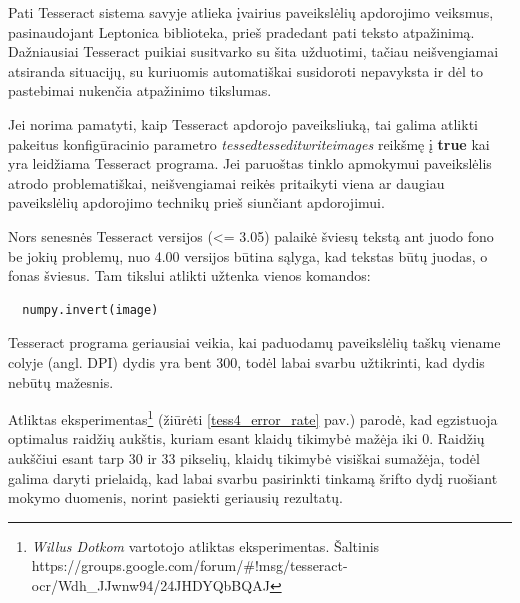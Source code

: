 \documentclass{VUMIFInfBakalaurinis}
\begin{document}
Pati Tesseract sistema savyje atlieka įvairius paveikslėlių apdorojimo veiksmus, pasinaudojant Leptonica biblioteka, prieš pradedant pati teksto atpažinimą.
Dažniausiai Tesseract puikiai susitvarko su šita užduotimi, tačiau neišvengiamai atsiranda situacijų, su kuriuomis automatiškai susidoroti nepavyksta ir dėl to pastebimai nukenčia
atpažinimo tikslumas.

Jei norima pamatyti, kaip Tesseract apdorojo paveiksliuką, tai galima atlikti pakeitus konfigūracinio parametro \textit{tessedtessedit\textunderscore write\textunderscore images} reikšmę į \textbf{true}
kai yra leidžiama Tesseract programa. Jei paruoštas tinklo apmokymui paveikslėlis atrodo problematiškai, neišvengiamai reikės pritaikyti viena ar daugiau paveikslėlių apdorojimo technikų
prieš siunčiant apdorojimui.

Nors senesnės Tesseract versijos (<= 3.05) palaikė šviesų tekstą ant juodo fono be jokių problemų, nuo 4.00 versijos būtina sąlyga, kad tekstas būtų juodas, o fonas šviesus.
Tam tikslui atlikti užtenka vienos komandos:
\begin{verbatim}
  numpy.invert(image)
\end{verbatim}

Tesseract programa geriausiai veikia, kai paduodamų paveikslėlių taškų viename colyje (angl. DPI) dydis yra bent 300, todėl labai svarbu užtikrinti, kad dydis nebūtų mažesnis.

Atliktas eksperimentas\footnote{\textit{Willus Dotkom} vartotojo atliktas eksperimentas. Šaltinis https://groups.google.com/forum/\#!msg/tesseract-ocr/Wdh\_JJwnw94/24JHDYQbBQAJ}
(žiūrėti \ref{tess4_error_rate} pav.) parodė, kad egzistuoja optimalus raidžių aukštis, kuriam esant klaidų tikimybė mažėja iki 0. Raidžių aukščiui esant tarp 30 ir 33 pikselių, klaidų tikimybė visiškai sumažėja,
todėl galima daryti prielaidą, kad labai svarbu pasirinkti tinkamą šrifto dydį ruošiant mokymo duomenis, norint pasiekti geriausių rezultatų.
\end{document}
